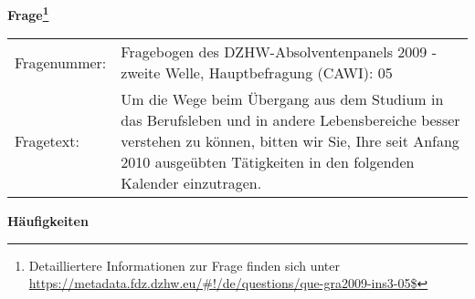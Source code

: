 				\vspace*{0.5cm}
                \noindent\textbf{Frage\footnote{Detailliertere Informationen zur Frage finden sich unter
		              \url{https://metadata.fdz.dzhw.eu/\#!/de/questions/que-gra2009-ins3-05$}}}\\
				\begin{tabularx}{\hsize}{@{}lX}
					Fragenummer: &
					  Fragebogen des DZHW-Absolventenpanels 2009 - zweite Welle, Hauptbefragung (CAWI):
					  05
 \\
					Fragetext: & Um die Wege beim Übergang aus dem Studium in das Berufsleben und in andere Lebensbereiche besser verstehen zu können, bitten wir Sie, Ihre seit Anfang 2010 ausgeübten Tätigkeiten in den folgenden Kalender einzutragen. \\
				\end{tabularx}





        		\vspace*{0.5cm}
                \noindent\textbf{Häufigkeiten}

